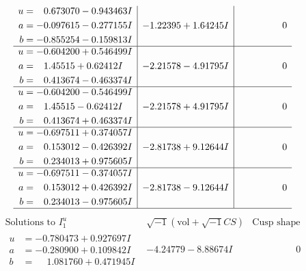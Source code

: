 \documentclass[1p]{elsarticle_modified}
\theoremstyle{definition}
\newcommand{\I}{\sqrt{-1}}
\begin{document}
$$\begin{array}{c|c|c}
\begin{aligned}
u &= \phantom{-}0.673070 - 0.943463 I \\
a &= -0.097615 - 0.277155 I \\
b &= -0.855254 - 0.159813 I\end{aligned}
 & -1.22395 + 1.64245 I & \phantom{-0.000000 } 0 \\ \hline\begin{aligned}
u &= -0.604200 + 0.546499 I \\
a &= \phantom{-}1.45515 + 0.62412 I \\
b &= \phantom{-}0.413674 - 0.463374 I\end{aligned}
 & -2.21578 - 4.91795 I & \phantom{-0.000000 } 0 \\ \hline\begin{aligned}
u &= -0.604200 - 0.546499 I \\
a &= \phantom{-}1.45515 - 0.62412 I \\
b &= \phantom{-}0.413674 + 0.463374 I\end{aligned}
 & -2.21578 + 4.91795 I & \phantom{-0.000000 } 0 \\ \hline\begin{aligned}
u &= -0.697511 + 0.374057 I \\
a &= \phantom{-}0.153012 - 0.426392 I \\
b &= \phantom{-}0.234013 + 0.975605 I\end{aligned}
 & -2.81738 + 9.12644 I & \phantom{-0.000000 } 0 \\ \hline\begin{aligned}
u &= -0.697511 - 0.374057 I \\
a &= \phantom{-}0.153012 + 0.426392 I \\
b &= \phantom{-}0.234013 - 0.975605 I\end{aligned}
 & -2.81738 - 9.12644 I & \phantom{-0.000000 } 0\\
 \hline 
 \end{array}$$\newpage$$\begin{array}{c|c|c}  
\text{Solutions to }I^u_{1}& \I (\text{vol} + \sqrt{-1}CS) & \text{Cusp shape}\\
 \hline 
\begin{aligned}
u &= -0.780473 + 0.927697 I \\
a &= -0.280900 + 0.109842 I \\
b &= \phantom{-}1.081760 + 0.471945 I\end{aligned}
 & -4.24779 - 8.88674 I & \phantom{-0.000000 } 0 \\ \hline\begin{aligned}

\end{aligned}
\end{array}$$
\end{document}
